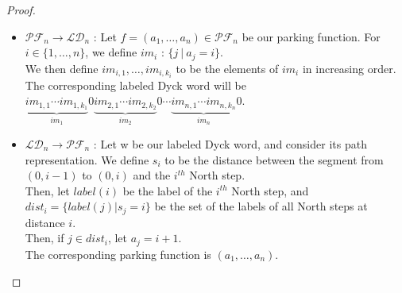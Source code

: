 \begin{proof}
    ~\
    \begin{itemize}
        \item $\mathcal{PF}_n \to \mathcal{LD}_n$ :
        Let $f = (a_1, \ldots, a_n) \in \mathcal{PF}_n$
        be our parking function. For $i \in \{1, \ldots,
        n\}$, we define $im_i$ : $\{j\ |\ a_j = i\}$. \\
        We then define $im_{i,1}, \ldots, im_{i,k_i}$ to be
        the elements of $im_i$ in increasing order.\\
        The corresponding labeled Dyck word will be \\
        $\underbrace{im_{1,1} \cdots im_{1,k_1}}_{im_1}0
         \underbrace{im_{2,1} \cdots im_{2,k_2}}_{im_2}0
         \cdots
         \underbrace{im_{n,1} \cdots im_{n,k_n}}_{im_n}0$.

        \item $\mathcal{LD}_n \to \mathcal{PF}_n$ :
        Let w be our labeled Dyck word, and consider its
        path representation. We define $s_i$ to be the
        distance between the segment from $(0, i-1)$ to
        $(0,i)$ and the $i^{th}$ North step.\\
        Then, let $label(i)$ be the label of the $i^{th}$
        North step, and $dist_i = \{label(j) | s_j = i\}$
        be the set of the labels of all North steps at
        distance $i$.\\
        Then, if $j \in dist_i$, let $a_j = i + 1$.\\
        The corresponding parking function is
        $(a_1, \ldots, a_n)$.
    \end{itemize}
\end{proof}

